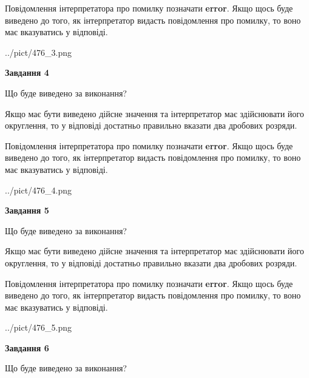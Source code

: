 \documentclass[12pt, ukrainian]{article}
\begin{document}
{\begin {Large}
Повідомлення інтерпретатора про помилку позначати \textbf{error}.
Якщо щось буде виведено до того, як інтерпретатор видасть повідомлення про помилку, 
то воно має вказуватись у відповіді. \par

\begin{center}
	{../pict/476_3.png}
\end{center}
\newpage

{\begin {center}\textbf{Завдання 4}\end {center}}\par
Що буде виведено за виконання? \par

Якщо має бути виведено дійсне значення та інтерпретатор має здійснювати його округлення, 
то у відповіді достатньо правильно вказати два дробових розряди.

Повідомлення інтерпретатора про помилку позначати \textbf{error}.
Якщо щось буде виведено до того, як інтерпретатор видасть повідомлення про помилку, 
то воно має вказуватись у відповіді. \par

\begin{center}
	{../pict/476_4.png}
\end{center}
\newpage

{\begin {center}\textbf{Завдання 5}\end {center}}\par
Що буде виведено за виконання? \par

Якщо має бути виведено дійсне значення та інтерпретатор має здійснювати його округлення, 
то у відповіді достатньо правильно вказати два дробових розряди.

Повідомлення інтерпретатора про помилку позначати \textbf{error}.
Якщо щось буде виведено до того, як інтерпретатор видасть повідомлення про помилку, 
то воно має вказуватись у відповіді. \par

\begin{center}
	{../pict/476_5.png}
\end{center}
\newpage

{\begin {center}\textbf{Завдання 6}\end {center}}\par
Що буде виведено за виконання? \par


\end{Large}}
\end{document}
